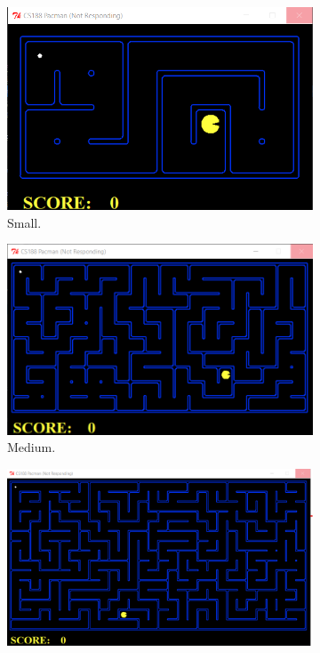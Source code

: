 \documentclass[a4paper,12pt]{report}
\begin{document}
\vspace{0.5cm}
\begin{figure}[h!]
  \centering
  \begin{subfigure}[b]{0.4\linewidth}
    \includegraphics[width=\linewidth]{pictures/mazeSizes/small.png}
    \caption{Small.}
  \end{subfigure}
  \begin{subfigure}[b]{0.4\linewidth}
    \includegraphics[width=\linewidth]{pictures/mazeSizes/medium.png}
    \caption{Medium.}
  \end{subfigure}
 \begin{subfigure}[b]{0.4\linewidth}
    \includegraphics[width=\linewidth]{pictures/mazeSizes/large.png}

\end{subfigure}
\end{figure}
\end{document}
